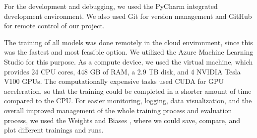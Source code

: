 For the development and debugging, we used the PyCharm \cite{pycharm} integrated development environment. We also used Git \cite{git} for version management and GitHub \cite{github} for remote control of our project.

The training of all models was done remotely in the cloud environment, since this was the fastest and most feasible option. We utilized the Azure Machine Learning Studio \cite{azure-ml} for this purpose. As a compute device, we used the virtual machine, which provides 24 CPU cores, 448 GB of RAM, a 2.9 TB disk, and 4 NVIDIA Tesla V100 GPUs. The computationally expensive tasks used CUDA \cite{cuda} for GPU acceleration, so that the training could be completed in a shorter amount of time compared to the CPU. For easier monitoring, logging, data visualization, and the overall improved management of the whole training process and evaluation process, we used the Weights and Biases \cite{wandb}, where we could save, compare, and plot different trainings and runs.